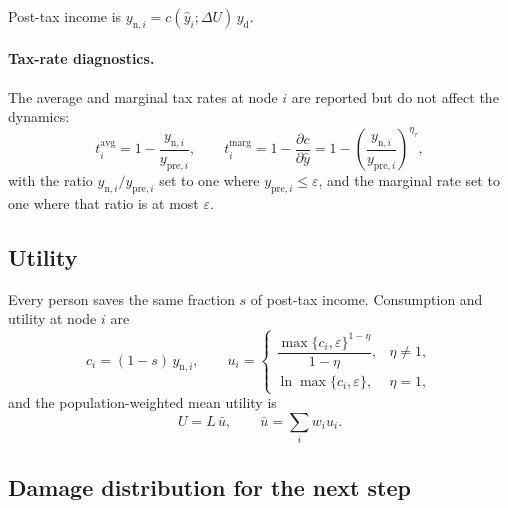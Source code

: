 \documentclass[11pt]{article}
\newcommand{\etat}{\eta_{\tau}}
\newcommand{\yd}{y_{\mathrm{d}}}
\begin{document}
Post-tax income is $y_{\mathrm{n},i} = c(\hat y_i;\Delta U)\,\yd$.

\paragraph{Tax-rate diagnostics.} The average and marginal tax rates at node
$i$ are reported but do not affect the dynamics:
\begin{equation}
  t^{\mathrm{avg}}_i = 1 - \frac{y_{\mathrm{n},i}}{y_{\mathrm{pre},i}}, \qquad
  t^{\mathrm{marg}}_i = 1 - \frac{\partial c}{\partial\hat y}
  = 1 - \left(\frac{y_{\mathrm{n},i}}{y_{\mathrm{pre},i}}\right)^{\etat},
\end{equation}
with the ratio $y_{\mathrm{n},i}/y_{\mathrm{pre},i}$ set to one where
$y_{\mathrm{pre},i}\le\varepsilon$, and the marginal rate set to one where that
ratio is at most $\varepsilon$.

\subsection{Utility}

Every person saves the same fraction $s$ of post-tax income. Consumption and
utility at node $i$ are
\begin{equation}
  c_i = (1-s)\,y_{\mathrm{n},i}, \qquad
  u_i = \begin{cases}
    \dfrac{\max\{c_i,\varepsilon\}^{1-\eta}}{1-\eta}, & \eta\ne1,\\[8pt]
    \ln\max\{c_i,\varepsilon\}, & \eta = 1,
  \end{cases}
\end{equation}
and the population-weighted mean utility is
\begin{equation}
  U = L\,\bar u, \qquad \bar u = \sum_i w_i u_i .
\end{equation}

\subsection{Damage distribution for the next step}
\label{sec:damage-update}
\end{document}
